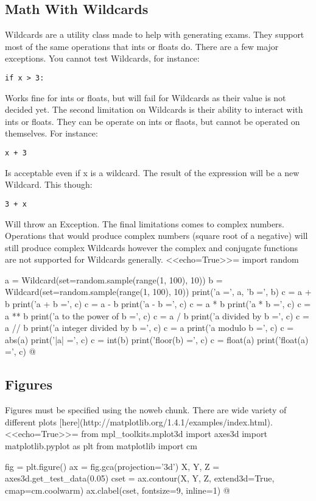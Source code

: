 \documentclass[12pt]{exam}
\begin{document}
\subsection{Math With Wildcards}
Wildcards are a utility class made to help with generating exams. They support most of the same operations that ints or
floats do. There are a few major exceptions. You cannot test Wildcards, for instance:
\begin{verbatim}
if x > 3:
\end{verbatim}
Works fine for ints or floats, but will fail for Wildcards as their value is not decided yet. The second limitation on
Wildcards is their ability to interact with ints or floats. They can be operate on ints or flaots, but cannot be
operated on themselves. For instance:
\begin{verbatim}
x + 3
\end{verbatim}
Is acceptable even if x is a wildcard. The result of the expression will be a new Wildcard. This though:
\begin{verbatim}
3 + x
\end{verbatim}
Will throw an Exception. The final limitations comes to complex numbers. Operations that would produce complex numbers
(square root of a negative) will still produce complex Wildcards however the complex and conjugate functions are not
supported for Wildcards generally.
<<echo=True>>=
import random

a = Wildcard(set=random.sample(range(1, 100), 10))
b = Wildcard(set=random.sample(range(1, 100), 10))
print('a =', a, 'b =', b)
c = a + b
print('a + b =', c)
c = a - b
print('a - b =', c)
c = a * b
print('a * b =', c)
c = a ** b
print('a to the power of b =', c)
c = a / b
print('a divided by b =', c)
c = a // b
print('a integer divided by b =', c)
c = a %
print('a modulo b =', c)
c = abs(a)
print('|a| =', c)
c = int(b)
print('floor(b) =', c)
c = float(a)
print('float(a) =', c)
@

\subsection{Figures}
Figures must be specified using the noweb chunk. There are wide variety of different plots
[here](http://matplotlib.org/1.4.1/examples/index.html).
<<echo=True>>=
from mpl_toolkits.mplot3d import axes3d
import matplotlib.pyplot as plt
from matplotlib import cm

fig = plt.figure()
ax = fig.gca(projection='3d')
X, Y, Z = axes3d.get_test_data(0.05)
cset = ax.contour(X, Y, Z, extend3d=True, cmap=cm.coolwarm)
ax.clabel(cset, fontsize=9, inline=1)
@
\end{document}
